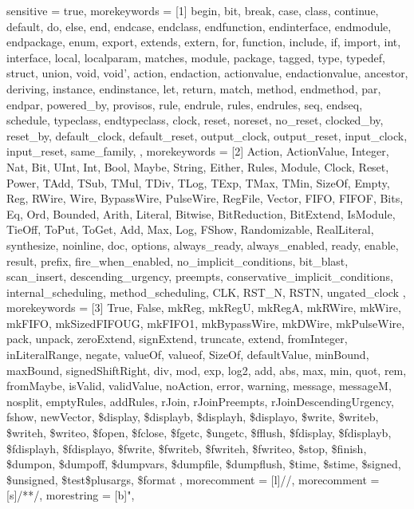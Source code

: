 {
  sensitive = true,
  morekeywords = [1]{
    begin,
    bit,
    break,
    case,
    class,
    continue,
    default,
    do,
    else,
    end,
    endcase,
    endclass,
    endfunction,
    endinterface,
    endmodule,
    endpackage,
    enum,
    export,
    extends,
    extern,
    for,
    function,
    include,
    if,
    import,
    int,
    interface,
    local,
    localparam,
    matches,
    module,
    package,
    tagged,
    type,
    typedef,
    struct,
    union,
    void,
    void',
    action,
    endaction,
    actionvalue,
    endactionvalue,
    ancestor,
    deriving,
    instance,
    endinstance,
    let,
    return,
    match,
    method,
    endmethod,
    par,
    endpar,
    powered_by,
    provisos,
    rule,
    endrule,
    rules,
    endrules,
    seq,
    endseq,
    schedule,
    typeclass,
    endtypeclass,
    clock,
    reset,
    noreset,
    no_reset,
    clocked_by,
    reset_by,
    default_clock,
    default_reset,
    output_clock,
    output_reset,
    input_clock,
    input_reset,
    same_family,
  },
  morekeywords = [2]{
    Action,
    ActionValue,
    Integer,
    Nat,
    Bit,
    UInt,
    Int,
    Bool,
    Maybe,
    String,
    Either,
    Rules,
    Module,
    Clock,
    Reset,
    Power,
    TAdd, TSub, TMul, TDiv, TLog, TExp, TMax, TMin, SizeOf,
    Empty,
    Reg,
    RWire, Wire, BypassWire, PulseWire,
    RegFile,
    Vector,
    FIFO, FIFOF,
    Bits, Eq, Ord, Bounded,
    Arith, Literal, Bitwise, BitReduction, BitExtend,
    IsModule, TieOff, ToPut, ToGet,
    Add, Max, Log, FShow, Randomizable, RealLiteral,
    synthesize, noinline, doc, options,
    always_ready, always_enabled,
    ready, enable, result, prefix,
    fire_when_enabled, no_implicit_conditions,
    bit_blast, scan_insert,
    descending_urgency, preempts, conservative_implicit_conditions,
    internal_scheduling, method_scheduling,
    CLK, RST_N, RSTN, ungated_clock
  }, 
  morekeywords = [3]{
    True,
    False,
    mkReg, mkRegU, mkRegA, mkRWire, mkWire, mkFIFO, mkSizedFIFOUG, mkFIFO1,
    mkBypassWire, mkDWire, mkPulseWire,
    pack, unpack, zeroExtend, signExtend, truncate, extend,
    fromInteger, inLiteralRange, negate,
    valueOf, valueof, SizeOf, defaultValue,
    minBound, maxBound,
    signedShiftRight, div, mod, exp, log2, add, abs, max, min, quot, rem,
    fromMaybe, isValid, validValue, noAction,
    error, warning, message, messageM,
    nosplit, emptyRules, addRules, rJoin, rJoinPreempts, rJoinDescendingUrgency,
    fshow, newVector,
    \$display,
    \$displayb,
    \$displayh,
    \$displayo,
    \$write,
    \$writeb,
    \$writeh,
    \$writeo,
    \$fopen,
    \$fclose,
    \$fgetc,
    \$ungetc,
    \$fflush,
    \$fdisplay,
    \$fdisplayb,
    \$fdisplayh,
    \$fdisplayo,
    \$fwrite,
    \$fwriteb,
    \$fwriteh,
    \$fwriteo,
    \$stop,
    \$finish,
    \$dumpon,
    \$dumpoff,
    \$dumpvars,
    \$dumpfile,
    \$dumpflush,
    \$time,
    \$stime,
    \$signed,
    \$unsigned,
    \$test\$plusargs,
    \$format
  },
  morecomment = [l]{//},
  morecomment = [s]{/*}{*/},
  morestring = [b]",
}